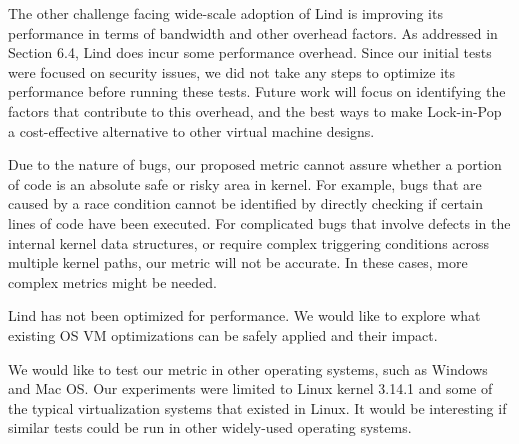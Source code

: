 The other challenge facing wide-scale adoption of Lind is improving its
performance in terms of bandwidth and other overhead factors. As addressed in
Section 6.4, Lind does incur some performance overhead. Since our initial tests
were focused on security issues, we did not take any steps to optimize
its performance before running these tests. Future work will focus on identifying
the factors that contribute to this overhead, and the best ways to make Lock-in-Pop
a cost-effective alternative to other virtual machine designs.

Due to the nature of bugs, our proposed metric cannot assure whether a portion of code
is an absolute safe or risky area in kernel.
For example, bugs that are caused
by a race condition cannot be identified by directly checking if certain lines of
code have been executed. For complicated bugs that involve defects in the internal
kernel data structures, or require complex triggering conditions across multiple
kernel paths, our metric will not be accurate.
In these cases, more complex metrics might be needed.




Lind has not been optimized for performance.
We would like to explore what existing OS VM optimizations can be safely applied
and their impact.

We would like to test our metric in other operating systems, such as Windows and Mac OS.
Our experiments were limited to Linux kernel 3.14.1 and some of the typical virtualization systems that existed in Linux.
It would be interesting
if similar tests could be run in other widely-used operating systems.
